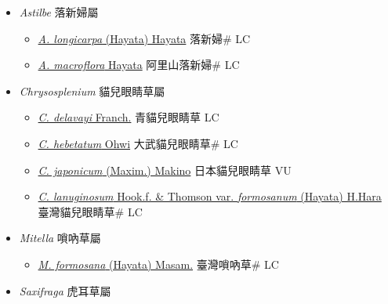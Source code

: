
  \begin{itemize}
 \item[] \textit{Astilbe} 落新婦屬
                    
  \begin{itemize}
        \item[] \href{http://www.theplantlist.org/tpl1.1/search?q=Astilbe+longicarpa}{\textit{A. longicarpa} (Hayata) Hayata}   落新婦\# LC
        \item[] \href{http://www.theplantlist.org/tpl1.1/search?q=Astilbe+macroflora}{\textit{A. macroflora} Hayata}   阿里山落新婦\# LC
  \end{itemize}
 \item[] \textit{Chrysosplenium} 貓兒眼睛草屬
                    
  \begin{itemize}
        \item[] \href{http://www.theplantlist.org/tpl1.1/search?q=Chrysosplenium+delavayi}{\textit{C. delavayi} Franch.}   青貓兒眼睛草 LC
        \item[] \href{http://www.theplantlist.org/tpl1.1/search?q=Chrysosplenium+hebetatum}{\textit{C. hebetatum} Ohwi}   大武貓兒眼睛草\# LC
        \item[] \href{http://www.theplantlist.org/tpl1.1/search?q=Chrysosplenium+japonicum}{\textit{C. japonicum} (Maxim.) Makino}   日本貓兒眼睛草 VU
        \item[] \href{http://www.theplantlist.org/tpl1.1/search?q=Chrysosplenium+lanuginosum+var.+formosanum}{\textit{C. lanuginosum} Hook.f. \& Thomson var. \textit{formosanum} (Hayata) H.Hara}   臺灣貓兒眼睛草\# LC
  \end{itemize}
 \item[] \textit{Mitella} 嗩吶草屬
                    
  \begin{itemize}
        \item[] \href{http://www.theplantlist.org/tpl1.1/search?q=Mitella+formosana}{\textit{M. formosana} (Hayata) Masam.}   臺灣嗩吶草\# LC
  \end{itemize}
 \item[] \textit{Saxifraga} 虎耳草屬
                    

\end{itemize}
